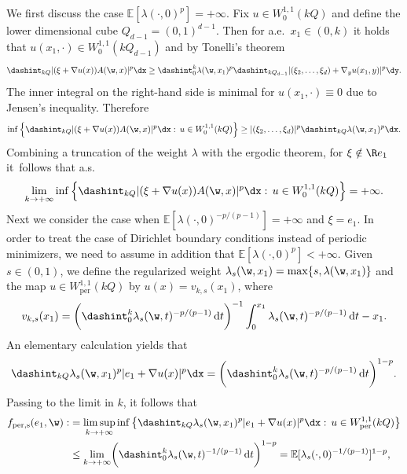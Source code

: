 \begin{example}
We first discuss the case $\mathbb{E}[\lambda(\cdot,0)^p]=+\infty$. Fix $u\in W^{1,1}_0(kQ)$ and define the lower dimensional cube $Q_{d-1}=(0,1)^{d-1}$. Then for a.e.\ $x_1\in (0,k)$ it holds that $u(x_1,\cdot)\in W_0^{1,1}(kQ_{d-1})$ and by Tonelli's theorem
\begin{equation*}
\dashint_{kQ}|(\xi+\nabla u(x))A(\w,x)|^p\dx\geq\dashint_0^k\lambda(\w,x_1)^p \dashint_{kQ_{d-1}}|(\xi_2,\ldots,\xi_d)+\nabla_yu(x_1,y)|^p\dy.
\end{equation*}
The inner integral on the right-hand side is minimal for $u(x_1,\cdot)\equiv 0$ due to Jensen's inequality. Therefore
\begin{equation*}
\inf\left\{\dashint_{kQ}|(\xi+\nabla u(x))A(\w,x)|^p\dx:\,u\in W^{1,1}_0(kQ)\right\}\geq |(\xi_2,\ldots,\xi_d)|^p\dashint_{kQ}\lambda(\w,x_1)^p\dx.
\end{equation*}
Combining a truncation of the weight $\lambda$ with the ergodic theorem, for $\xi\notin\R e_1$ it~follows that a.s.
\begin{equation}\label{eq:toinfinity}
\lim_{k\to +\infty}\inf\left\{\dashint_{kQ}|(\xi+\nabla u(x))A(\w,x)|^p\dx:\,u\in W^{1,1}_0(kQ)\right\}=+\infty.
\end{equation}
Next we consider the case when $\mathbb{E}[\lambda(\cdot,0)^{-p/(p-1)}]=+\infty$ and $\xi=e_1$. In order to treat the case of Dirichlet boundary conditions instead of periodic minimizers, we need to assume in addition that $\mathbb{E}[\lambda(\cdot,0)^p]<+\infty$. Given $s\in (0,1)$, we define the regularized weight $\lambda_s(\w,x_1)=\max\{s,\lambda(\w,x_1)\}$ and the map $u\in W^{1,1}_\mathrm{per}(kQ)$ by $u(x)=v_{k,s}(x_1)$, where
\begin{equation*}
v_{k,s}(x_1)=\biggl(\dashint_0^k\lambda_s(\w,t)^{-p/(p-1)}\,\mathrm{d}t\biggr)^{-1}\int_0^{x_1}\lambda_s(\w,t)^{-p/(p-1)}\,\mathrm{d}t-x_1.
\end{equation*}
An elementary calculation yields that
\begin{align*}
\dashint_{kQ}\lambda_s(\w,x_1)^p|e_1+\nabla u(x)|^p\dx= \biggl(\dashint_0^k\lambda_s(\w,t)^{-p/(p-1)}\,\mathrm{d}t\biggr)^{1-p}.
\end{align*}
Passing to the limit in $k$, it follows that
\begin{align*}
f_\mathrm{per,s}(e_1,\w):&=\limsup_{k\to +\infty}\inf\left\{\dashint_{kQ}\lambda_{s}(\w,x_1)^p|e_1+\nabla u(x)|^p\dx:\,u\in W^{1,1}_\mathrm{per}(kQ)\right\}
\\
&\leq \lim_{k\to +\infty}\biggl(\dashint_0^k\lambda_s(\w,t)^{-1/(p-1)}\,\mathrm{d}t\biggr)^{1-p}=\mathbb{E}[\lambda_s(\cdot,0)^{-1/(p-1)}]^{1-p},

\end{align*}
\end{example}
